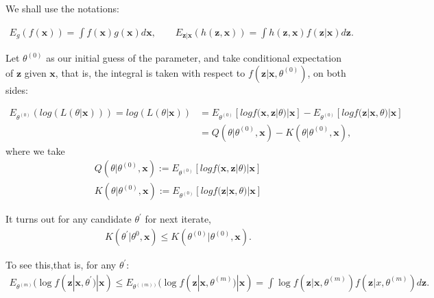 \documentclass[
  14pt,
]{article}
\begin{document}
We shall use the notations:

\begin{align*}
E_{g}(f(\boldsymbol{x})) = \int f(\boldsymbol{x})g(\boldsymbol{x}) d\boldsymbol{x}, \qquad E_{\boldsymbol{z}|\boldsymbol{x}}(h(\boldsymbol{z},\boldsymbol{x})) = \int h(\boldsymbol{z},\boldsymbol{x})f(\boldsymbol{z}|\boldsymbol{x}) d\boldsymbol{z}. 
\end{align*}

Let \(\theta^{(0)}\) as our initial guess of the parameter, and take
conditional expectation of \(\boldsymbol{z}\) given \(\boldsymbol{x}\),
that is, the integral is taken with respect to
\(f(\boldsymbol{z}| \boldsymbol{x},\theta^{(0)})\), on both sides:

\begin{align*}
  E_{\theta^{(0)}}(log(L(\theta|\boldsymbol{x})))  = log(L(\theta|\boldsymbol{x})) & = E_{\theta^{(0)}}[logf(\boldsymbol{x},\boldsymbol{z}|\theta)|\boldsymbol{x}] - E_{\theta^{(0)}}[logf(\boldsymbol{z}|\boldsymbol{x},\theta)|\boldsymbol{x}] \\ 
  & = Q(\theta | \theta^{(0)},\boldsymbol{x}) - K(\theta | \theta^{(0)},\boldsymbol{x}), 
\end{align*} where we take \begin{align*}
Q(\theta | \theta^{(0)},\boldsymbol{x}) := E_{\theta^{(0)}}[logf(\boldsymbol{x},\boldsymbol{z}|\theta)|\boldsymbol{x}] \\
 K(\theta | \theta^{(0)},\boldsymbol{x}):= E_{\theta^{(0)}}[logf(\boldsymbol{z}|\boldsymbol{x},\theta)|\boldsymbol{x}] 
\end{align*}

It turns out for any candidate \(\theta^{'}\) for next iterate,
\begin{align*}
  K(\theta^{'}|\theta^{0},\boldsymbol{x}) \le K(\theta^{(0)} | \theta^{(0)},\boldsymbol{x}). 
\end{align*}

To see this,that is, for any \(\theta^{'}\): \begin{align*}
  E_{\theta^{(m)}}(\log f(\boldsymbol{z}|\boldsymbol{x},{\theta}^{'})|\boldsymbol{x}) \le E_{\theta^{((m))}}(\log f(\boldsymbol{z}|\boldsymbol{x},\theta^{(m)})|\boldsymbol{x})= \int \log f(\boldsymbol{z}| \boldsymbol{x},\theta^{(m)})f(\boldsymbol{z}|x,\theta^{(m)}) d\boldsymbol{z}. 
\end{align*}
\end{document}
